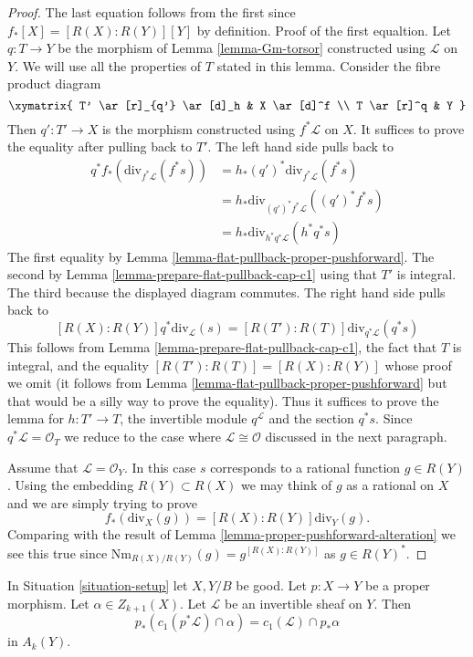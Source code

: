 \begin{proof}
The last equation follows from the first since $f_*[X] = [R(X) : R(Y)][Y]$ by
definition. Proof of the first equaltion. Let $q : T \to Y$ be the morphism of
Lemma \ref{lemma-Gm-torsor} constructed using $\mathcal{L}$ on $Y$. We will use
all the properties of $T$ stated in this lemma. Consider the fibre product
diagram
$$
\xymatrix{
T' \ar[r]_{q'} \ar[d]_h & X \ar[d]^f \\
T \ar[r]^q & Y
}
$$
Then $q' : T' \to X$ is the morphism constructed using $f^*\mathcal{L}$
on $X$. It suffices to prove the equality after pulling back to $T'$.
The left hand side pulls back to
\begin{align*}
q^*f_*\left(\text{div}_{f^*\mathcal{L}}(f^*s)\right)
& =
h_*(q')^*\text{div}_{f^*\mathcal{L}}(f^*s) \\
& =
h_*\text{div}_{(q')^*f^*\mathcal{L}}((q')^*f^*s) \\
& =
h_*\text{div}_{h^*q^*\mathcal{L}}(h^*q^*s)
\end{align*}
The first equality by Lemma \ref{lemma-flat-pullback-proper-pushforward}.
The second by Lemma \ref{lemma-prepare-flat-pullback-cap-c1}
using that $T'$ is integral. The third because the displayed diagram commutes.
The right hand side pulls back to
$$
[R(X) : R(Y)]q^*\text{div}_\mathcal{L}(s) =
[R(T') : R(T)]\text{div}_{q^*\mathcal{L}}(q^*s)
$$
This follows from Lemma \ref{lemma-prepare-flat-pullback-cap-c1},
the fact that $T$ is integral, and the equality
$[R(T') : R(T)] = [R(X) : R(Y)]$ whose proof we omit
(it follows from Lemma \ref{lemma-flat-pullback-proper-pushforward}
but that would be a silly way to prove the equality).
Thus it suffices to prove the lemma for $h : T' \to T$, the
invertible module $q^\mathcal{L}$ and the section $q^*s$.
Since $q^*\mathcal{L} = \mathcal{O}_T$
we reduce to the case where $\mathcal{L} \cong \mathcal{O}$
discussed in the next paragraph.

\medskip\noindent
Assume that $\mathcal{L} = \mathcal{O}_Y$. In this case $s$
corresponds to a rational function $g \in R(Y)$. Using the
embedding $R(Y) \subset R(X)$ we may think of $g$ as a rational
on $X$ and we are simply trying to prove
$$
f_*\left(\text{div}_X(g)\right) = [R(X) : R(Y)]\text{div}_Y(g).
$$
Comparing with the result of Lemma \ref{lemma-proper-pushforward-alteration}
we see this true since $\text{Nm}_{R(X)/R(Y)}(g) = g^{[R(X) : R(Y)]}$
as $g \in R(Y)^*$.
\end{proof}

\begin{lemma}
\label{lemma-pushforward-cap-c1}
In Situation \ref{situation-setup} let $X, Y/B$ be good.
Let $p : X \to Y$ be a proper morphism.
Let $\alpha \in Z_{k + 1}(X)$.
Let $\mathcal{L}$ be an invertible sheaf on $Y$.
Then
$$
p_*(c_1(p^*\mathcal{L}) \cap \alpha) = c_1(\mathcal{L}) \cap p_*\alpha
$$
in $A_k(Y)$.
\end{lemma}

